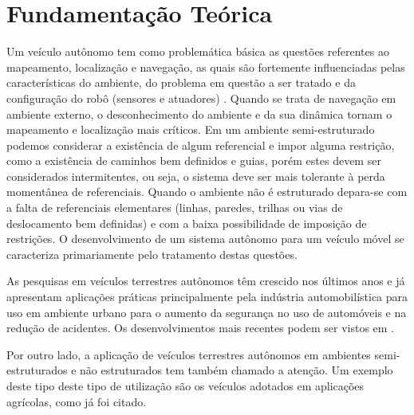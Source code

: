 \chapter{Fundamentação Teórica} 
\label{cap:referencial_teorico}

Um veículo autônomo tem como problemática básica as questões referentes ao
mapeamento, localização e navegação, as quais são fortemente influenciadas pelas
características do ambiente, do problema em questão a ser tratado e da
configuração do robô (sensores e atuadores) \cite{Wolf2009}. Quando se trata
de navegação em ambiente externo, o desconhecimento do ambiente e da sua
dinâmica tornam o mapeamento e localização mais críticos. Em um ambiente
semi-estruturado podemos considerar a existência de algum referencial e impor
alguma restrição, como a existência de caminhos bem definidos e guias, porém
estes devem ser considerados intermitentes, ou seja, o sistema deve ser mais
tolerante à perda momentânea de referenciais. Quando o ambiente não é
estruturado depara-se com a falta de referenciais elementares (linhas, paredes,
trilhas ou vias de deslocamento bem definidas) e com a baixa possibilidade de
imposição de restrições. O desenvolvimento de um sistema autônomo para um
veículo móvel se caracteriza primariamente pelo tratamento destas questões. 



As pesquisas em veículos terrestres autônomos têm crescido nos últimos anos e já
apresentam aplicações práticas principalmente pela indústria automobilística
para uso em ambiente urbano para o aumento da segurança no uso de automóveis e
na redução de acidentes. Os desenvolvimentos mais recentes podem ser vistos em
\cite{concepts}. 


Por outro lado, a aplicação de veículos terrestres autônomos em ambientes
semi-estruturados e não estruturados tem também chamado a atenção. Um exemplo
deste tipo deste tipo de utilização são os veículos adotados em aplicações
agrícolas, como já foi citado. 









